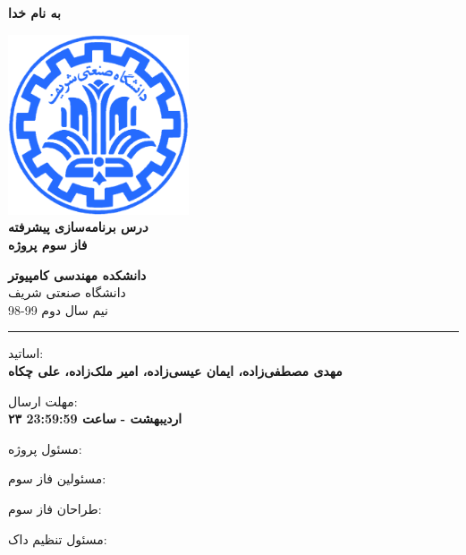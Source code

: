 \documentclass[]{article}
\begin{document}
\begin{titlepage}
\begin{center}

\textbf{ \Huge{به نام خدا} }
        
\vspace{0.2cm}

\includegraphics[width=0.4\textwidth]{sharif1.png}\\
\vspace{0.2cm}
\textbf{ \Huge{\emph درس برنامه‌سازی پیشرفته} }\\
\vspace{0.25cm}
\textbf{ \Large{ فاز سوم پروژه} }
\vspace{0.2cm}
       
 
      \large \textbf{دانشکده مهندسی کامپیوتر}\\\vspace{0.1cm}
    \large   دانشگاه صنعتی شریف\\\vspace{0.2cm}
       \large   ﻧﯿﻢ سال دوم 99-98 \\\vspace{0.10cm}
      \noindent\rule[1ex]{\linewidth}{1pt}
اساتید:\\
    \textbf{{مهدی مصطفی‌زاده، ایمان عیسی‌زاده، امیر ملک‌زاده، علی چکاه}}



    \vspace{0.20cm}

   مهلت ارسال:\\
    \textbf{{۲۳ اردیبهشت - }}
    \textbf{{ساعت 23:59:59}}

    \vspace{0.10cm}
مسئول پروژه:\\
    \textbf{}
    
        \vspace{0.10cm}
مسئولین فاز سوم:\\
    \textbf{}
    
        \vspace{0.10cm}
طراحان فاز سوم:\\
    \textbf{\authorFont{ }}
    
        \vspace{0.05cm}
مسئول تنظیم داک:\\
    \textbf{}
    

\end{center}
\end{titlepage}
\end{document}
